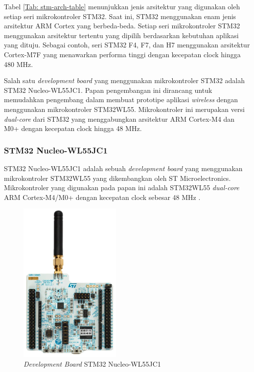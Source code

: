 Tabel \ref{Tab: stm-arch-table} menunjukkan jenis arsitektur yang digunakan oleh setiap seri mikrokontroler STM32. Saat ini, STM32 menggunakan enam jenis arsitektur ARM Cortex yang berbeda-beda. Setiap seri mikrokontroler STM32 menggunakan arsitektur tertentu yang dipilih berdasarkan kebutuhan aplikasi yang dituju. Sebagai contoh, seri STM32 F4, F7, dan H7 menggunakan arsitektur Cortex-M7F yang menawarkan performa tinggi dengan kecepatan clock hingga 480 MHz.

Salah satu \textit{development board} yang menggunakan mikrokontroler STM32 adalah STM32 Nucleo-WL55JC1. Papan pengembangan ini dirancang untuk memudahkan pengembang dalam membuat prototipe aplikasi \textit{wireless} dengan menggunakan mikrokontroler STM32WL55. Mikrokontroler ini merupakan versi \textit{dual-core} dari STM32 yang menggabungkan arsitektur ARM Cortex-M4 dan M0+ dengan kecepatan clock hingga 48 MHz.

\subsubsection{STM32 Nucleo-WL55JC1}
STM32 Nucleo-WL55JC1 adalah sebuah \textit{development board} yang menggunakan mikrokontroler STM32WL55 yang dikembangkan oleh ST Microelectronics. Mikrokontroler yang digunakan pada papan ini adalah STM32WL55 \textit{dual-core} ARM Cortex-M4/M0+ dengan kecepatan clock sebesar 48 MHz \cite{STMicroelectronics2022}.

\begin{figure}[H]
	\centering
	\includegraphics[width=5cm]{contents/chapter-2/stm32-wl55jc1.jpg}
	\caption{\textit{Development Board} STM32 Nucleo-WL55JC1}
	\label{Fig: STM32 Nucleo-WL55JC1}
\end{figure}

